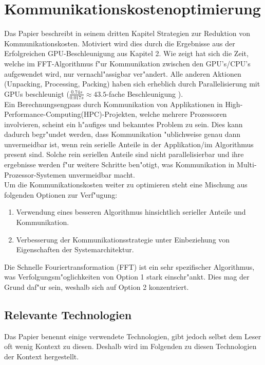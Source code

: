 \section{Kommunikationskostenoptimierung}
Das Papier \cite{mainpaper} beschreibt in seinem dritten Kapitel Strategien zur Reduktion von Kommunikationskosten. Motiviert wird dies durch die Ergebnisse aus der Erfolgreichen GPU-Beschleunigung aus Kapitel 2.
Wie \cite[Abb. 3]{mainpaper} zeigt hat sich die Zeit, welche im FFT-Algorithmus f"ur Kommunikation zwischen den GPU's/CPU's aufgewendet wird, nur vernachl"assigbar ver"andert. Alle anderen Aktionen (Unpacking, Processing, Packing) haben sich erheblich durch Parallelisierung mit GPUs beschleunigt ($ \frac{0.74s}{0.017s} \approx 43.5$-fache Beschleunigung ).\\

Ein Berechnungsengpass durch Kommunikation von Applikationen in High-Performance-Computing(HPC)-Projekten, welche mehrere Prozessoren involvieren, scheint ein h"aufiges und bekanntes Problem zu sein.
Dies kann dadurch begr"undet werden, dass Kommunikation "ublichweise genau dann unvermeidbar ist, wenn rein serielle Anteile in der Applikation/im Algorithmus present sind. Solche rein seriellen Anteile sind nicht parallelisierbar und ihre ergebnisse werden f"ur weitere Schritte ben"otigt, was Kommunikation in Multi-Prozessor-Systemen unvermeidbar macht.\\
Um die Kommunikationskosten weiter zu optimieren steht eine Mischung aus folgenden Optionen zur Verf"ugung:
\begin{enumerate}
	\item Verwendung eines besseren Algorithmus hinsichtlich serieller Anteile und Kommunikation.
	\item Verbesserung der Kommunikationsstrategie unter Einbeziehung von Eigenschaften der Systemarchitektur.
\end{enumerate}

Die Schnelle Fouriertransformation (FFT) ist ein sehr spezifischer Algorithmus, was Verfolgungsm"oglichkeiten von Option 1 stark einschr"ankt. Dies mag der Grund daf"ur sein, weshalb sich \cite{mainpaper} auf Option 2 konzentriert.

\subsection{Relevante Technologien}
Das Papier benennt einige verwendete Technologien, gibt jedoch selbst dem Leser oft wenig Kontext zu diesen. Deshalb wird im Folgenden zu diesen Technologien der Kontext hergestellt.

